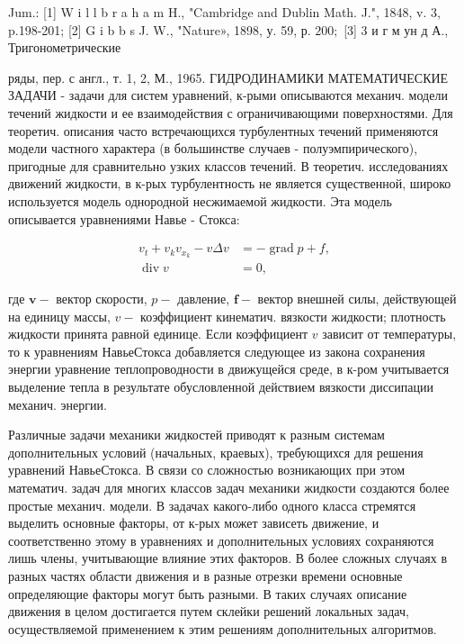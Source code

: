 \documentclass[10pt]{article}
\begin{document}
Jum.: [1] W i l l b r a h a m H., "Cambridge and Dublin Math. J.", 1848, v. 3, p.198-201; [2] G i b b s J. W., "Nature», 1898, у. 59, р. $200 ;$ [3] 3 и г м ун д А., Тригонометрические

ряды, пер. с англ., т. 1, 2, М., 1965. ГИДРОДИНАМИКИ МАТЕМАТИЧЕСКИЕ ЗАДАЧИ - задачи для систем уравнений, к-рыми описываются механич. модели течений жидкости и ее взаимодействия с ограничивающими поверхностями. Для теоретич. описания часто встречающихся турбулентных течений применяются модели частного характера (в большинстве случаев - полуэмпирического), пригодные для сравнительно узких классов течений. В теоретич. исследованиях движений жидкости, в к-рых турбулентность не является существенной, широко используется модель однородной несжимаемой жидкости. Эта модель описывается уравнениями Навье - Стокса:



\[

\begin{aligned}

v_{t}+v_{k} v_{x_{k}}-v \Delta v & =-\operatorname{grad} p+f, \\

\operatorname{div} v & =0,

\end{aligned}

\]



где $\boldsymbol{v}-$ вектор скорости, $p-$ давление, $\boldsymbol{f}-$ вектор внешней силы, действующей на единицу массы, $v-$ коэффициент кинематич. вязкости жидкости; плотность жидкости принята равной единице. Если коэффициент $v$ зависит от температуры, то к уравнениям НавьеСтокса добавляется следующее из закона сохранения энергии уравнение теплопроводности в движущейся среде, в к-ром учитывается выделение тепла в результате обусловленной действием вязкости диссипации механич. энергии.



Различные задачи механики жидкостей приводят к разным системам дополнительных условий (начальных, краевых), требующихся для решения уравнений НавьеСтокса. В связи со сложностью возникающих при этом математич. задач для многих классов задач механики жидкости создаются более простые механич. модели. В задачах какого-либо одного класса стремятся выделить основные факторы, от к-рых может зависеть движение, и соответственно этому в уравнениях и дополнительных условиях сохраняются лишь члены, учитывающие влияние этих факторов. В более сложных случаях в разных частях области движения и в разные отрезки времени основные определяющие факторы могут быть разными. В таких случаях описание движения в целом достигается путем склейки решений локальных задач, осуществляемой применением к этим решениям дополнительных алгоритмов.
\end{document}
